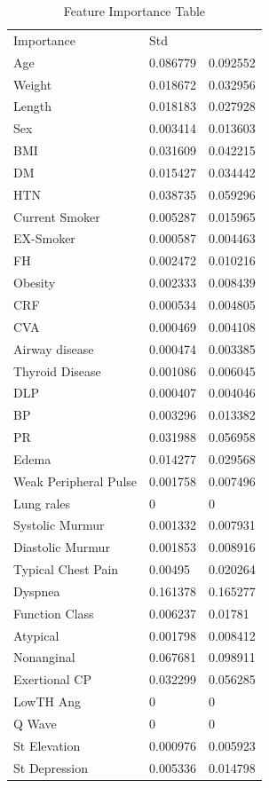 \documentclass[sigconf]{acmart}
\begin{document}
\begin{table}
\centering
\caption{Feature Importance Table}
\label{Importance}
\begin{tabular}{lll}
Importance            & Std      &          \\
Age                   & 0.086779 & 0.092552 \\
Weight                & 0.018672 & 0.032956 \\
Length                & 0.018183 & 0.027928 \\
Sex                   & 0.003414 & 0.013603 \\
BMI                   & 0.031609 & 0.042215 \\
DM                    & 0.015427 & 0.034442 \\
HTN                   & 0.038735 & 0.059296 \\
Current Smoker        & 0.005287 & 0.015965 \\
EX-Smoker             & 0.000587 & 0.004463 \\
FH                    & 0.002472 & 0.010216 \\
Obesity               & 0.002333 & 0.008439 \\
CRF                   & 0.000534 & 0.004805 \\
CVA                   & 0.000469 & 0.004108 \\
Airway disease        & 0.000474 & 0.003385 \\
Thyroid Disease       & 0.001086 & 0.006045 \\
DLP                   & 0.000407 & 0.004046 \\
BP                    & 0.003296 & 0.013382 \\
PR                    & 0.031988 & 0.056958 \\
Edema                 & 0.014277 & 0.029568 \\
Weak Peripheral Pulse & 0.001758 & 0.007496 \\
Lung rales            & 0        & 0        \\
Systolic Murmur       & 0.001332 & 0.007931 \\
Diastolic Murmur      & 0.001853 & 0.008916 \\
Typical Chest Pain    & 0.00495  & 0.020264 \\
Dyspnea               & 0.161378 & 0.165277 \\
Function Class        & 0.006237 & 0.01781  \\
Atypical              & 0.001798 & 0.008412 \\
Nonanginal            & 0.067681 & 0.098911 \\
Exertional CP         & 0.032299 & 0.056285 \\
LowTH Ang             & 0        & 0        \\
Q Wave                & 0        & 0        \\
St Elevation          & 0.000976 & 0.005923 \\
St Depression         & 0.005336 & 0.014798
\end{tabular}
\end{table}
\end{document}
